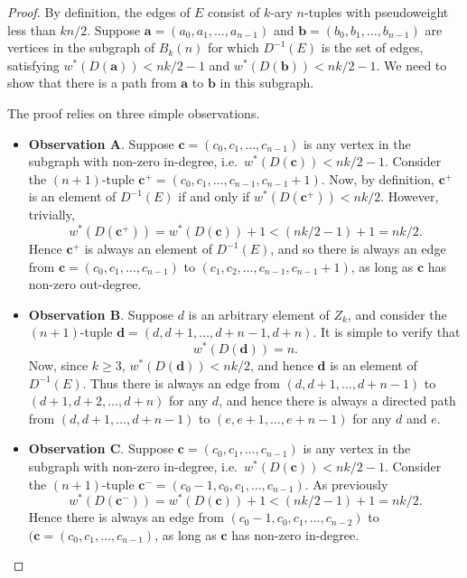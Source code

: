 \documentclass[a4paper,11pt]{article}
\begin{document}
\begin{proof}
By definition, the edges of $E$ consist of $k$-ary $n$-tuples with pseudoweight less than $kn/2$.
Suppose $\mathbf{a}=(a_0,a_1,\ldots,a_{n-1})$ and $\mathbf{b}=(b_0,b_1,\ldots,b_{n-1})$ are
vertices in the subgraph of $B_k(n)$ for which $D^{-1}(E)$ is the set of edges, satisfying
$w^*(D(\mathbf{a}))<nk/2-1$ and $w^*(D(\mathbf{b}))<nk/2-1$. We need to show that there is a path
from $\mathbf{a}$ to $\mathbf{b}$ in this subgraph.

The proof relies on three simple observations.
\begin{itemize}
\item {\bf Observation A}.  Suppose $\mathbf{c}=(c_0,c_1,\ldots,c_{n-1})$ is any vertex in the
    subgraph with non-zero in-degree, i.e.\ $w^*(D(\mathbf{c}))<nk/2-1$.  Consider the
    $(n+1)$-tuple $\mathbf{c}^+=(c_0,c_1,\ldots,c_{n-1},c_{n-1}+1)$. Now, by definition,
    $\mathbf{c}^+$ is an element of $D^{-1}(E)$ if and only if $w^*(D(\mathbf{c}^+))<nk/2$.
    However, trivially,
\[ w^*(D(\mathbf{c}^+))=w^*(D(\mathbf{c}))+1< (nk/2-1)+1=nk/2. \]
Hence $\mathbf{c}^+$ is always an element of $D^{-1}(E)$, and so there is always an edge from
$\mathbf{c}=(c_0,c_1,\ldots,c_{n-1})$ to $(c_1,c_2,\ldots,c_{n-1},c_{n-1}+1)$, as long as
$\mathbf{c}$ has non-zero out-degree.
\item {\bf Observation B}.  Suppose $d$ is an arbitrary element of $Z_k$, and consider the
    $(n+1)$-tuple $\mathbf{d}=(d,d+1,\ldots,d+n-1,d+n)$.  It is simple to verify that
    \[ w^*(D(\mathbf{d}))=n. \]
Now, since $k\geq3$, $w^*(D(\mathbf{d}))<nk/2$, and hence $\mathbf{d}$ is an element of
$D^{-1}(E)$.  Thus there is always an edge from $(d,d+1,\ldots,d+n-1)$ to
$(d+1,d+2,\ldots,d+n)$ for any $d$, and hence there is always a directed path from
$(d,d+1,\ldots,d+n-1)$ to $(e,e+1,\ldots,e+n-1)$ for any $d$ and $e$.
\item {\bf Observation C}.  Suppose $\mathbf{c}=(c_0,c_1,\ldots,c_{n-1})$ is any vertex in the
    subgraph with non-zero in-degree, i.e.\ $w^*(D(\mathbf{c}))<nk/2-1$.  Consider the
    $(n+1)$-tuple $\mathbf{c}^-=(c_0-1,c_0,c_1,\ldots,c_{n-1})$.  As previously
    \[ w^*(D(\mathbf{c}^-))=w^*(D(\mathbf{c}))+1< (nk/2-1)+1=nk/2. \]
Hence there is always an edge from $(c_0-1,c_0,c_1,\ldots,c_{n-2})$ to
$(\mathbf{c}=(c_0,c_1,\ldots,c_{n-1})$, as long as $\mathbf{c}$ has non-zero in-degree.
\end{itemize}


\end{proof}
\end{document}
